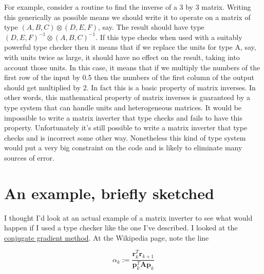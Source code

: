 \documentclass[12pt]{article}
\begin{document}
For example, consider a routine to find the inverse of a 3 by 3 matrix.
Writing this generically as possible means we should write it to operate on a matrix of type $(A,B,C)\otimes(D,E,F)$, say.
The result should have type $(D,E,F)^{-1}\otimes(A,B,C)^{-1}$.
If this type checks when used with a suitably powerful type checker then it means that if we replace the units for type A, say, with units twice as large, it should have no effect on the result, taking into account those units.
In this case, it means that if we multiply the numbers of the first row of the input by 0.5 then the numbers of the first column of the output should get multiplied by 2.
In fact this is a basic property of matrix inverses.
In other words, this mathematical property of matrix inverses is guaranteed by a type system that can handle units and heterogeneous matrices.
It would be impossible to write a matrix inverter that type checks and fails to have this property.
Unfortunately it's still possible to write a matrix inverter that type checks and is incorrect some other way.
Nonetheless this kind of type system would put a very big constraint on the code and is likely to eliminate many sources of error.

\section{An example, briefly sketched}
I thought I'd look at an actual example of a matrix inverter to see what would happen if I used a type checker like the one I've described.
I looked at the \href{https://en.wikipedia.org/wiki/Conjugate_gradient_method}{conjugate gradient method}.
At the Wikipedia page, note the line

$$\alpha_k:=\frac{\mathbf{r}_k^T\mathbf{r}_{k+1}}{\mathbf{p}_k^T\mathbf{Ap}_k}$$
\end{document}
